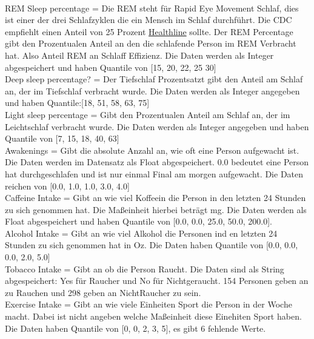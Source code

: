 \documentclass[usegeometry=true]{scrartcl}
\begin{document}
{\\ REM Sleep percentage = Die REM steht für Rapid Eye Movement Schlaf, dies ist einer der drei Schlafzyklen die ein Mensch im Schlaf durchführt. Die CDC empfiehlt einen Anteil von 25 Prozent  \href{https://www.healthline.com/health/how-much-deep-sleep-do-you-need}{Healthline} sollte.  Der REM Percentage gibt den Prozentualen Anteil an den die schlafende Person im REM Verbracht hat. Also Anteil REM an Schlaff Effizienz. Die Daten werden als Integer abgespeichert und haben Quantile von [15, 20, 22, 25 30]
\\ Deep sleep percentage? = Der Tiefschlaf Prozentsatzt gibt den  Anteil am Schlaf an, der im Tiefschlaf verbracht wurde. Die Daten werden als Integer angegeben und haben Quantile:[18, 51, 58, 63, 75] 
\\ Light sleep percentage = Gibt den Prozentualen Anteil am Schlaf an, der im Leichtschlaf verbracht wurde. Die Daten werden als Integer angegeben und haben Quantile von [7, 15, 18, 40, 63]
\\ Awakenings = Gibt die absolute Anzahl an, wie oft eine Person aufgewacht ist. Die Daten werden im Datensatz als Float abgespeichert. 0.0 bedeutet eine Person hat durchgeschlafen und ist nur einmal Final am morgen aufgewacht. Die Daten reichen von  [0.0, 1.0, 1.0, 3.0, 4.0]
\\ Caffeine Intake = Gibt an wie viel Koffeein die Person in den letzten 24 Stunden zu sich genommen hat. Die Maßeinheit hierbei beträgt mg. Die Daten werden als Float abgespeichert und haben Quantile von  [0.0, 0.0, 25.0, 50.0, 200.0].
\\ Alcohol Intake = Gibt an wie viel Alkohol die Personen ind en letzten 24 Stunden zu sich genommen hat in Oz. Die Daten haben Quantile von [0.0, 0.0, 0.0, 2.0, 5.0]
\\ Tobacco Intake = Gibt an ob die Person Raucht. Die Daten sind als String abgespeichert: Yes für Raucher und No für Nichtgeraucht. 154 Personen geben an zu Rauchen und 298 geben an NichtRaucher zu sein. 
\\ Exercise Intake = Gibt an wie viele Einheiten Sport die Person in der Woche macht. Dabei ist nicht angeben welche Maßeinheit diese Einehiten Sport haben. Die Daten haben Quantile von [0, 0, 2, 3, 5], es gibt 6 fehlende Werte.}
\end{document}
